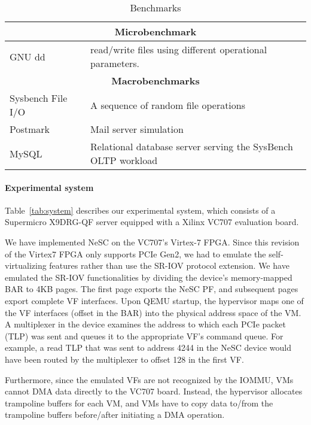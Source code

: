 \begin{table}[t]
  \small
  \begin{tabular}{|p{}|p{}|}
    \hline
    \multicolumn{2}{|c|}{\textbf{Microbenchmark}} \\
    \hline
    GNU dd~\cite{coreutils}	& read/write files using different operational parameters.\\
    \hline
    \hline
    \multicolumn{2}{|c|}{\textbf{Macrobenchmarks}} \\
    \hline
    Sysbench File I/O~\cite{kopytov2004sysbench}
    			& A sequence of random file operations \\
    \hline
    Postmark~\cite{katcher1997postmark}
    			& Mail server simulation \\
    \hline
    MySQL~\cite{mysql}	& Relational database server serving the SysBench OLTP workload  \\
    \hline
    \hline
  \end{tabular}

  \vspace*{-2ex}
  \caption{Benchmarks\label{tab:bench}}


\end{table}


\paragraph{Experimental system}
Table~\ref{tab:system} describes our experimental system, which consists of a Supermicro X9DRG-QF server equipped with a Xilinx VC707 evaluation board.

We have implemented NeSC on the VC707's Virtex-7 FPGA. Since this revision of the Virtex7 FPGA only supports PCIe Gen2, we had to emulate the self-virtualizing features rather than use the SR-IOV protocol extension. We have emulated the SR-IOV functionalities by dividing the device's memory-mapped BAR to 4KB pages. The first page exports the NeSC PF, and subsequent pages export complete VF interfaces. Upon QEMU startup, the hypervisor maps one of the VF interfaces (offset in the BAR) into the physical address space of the VM. A  multiplexer in the device examines the address to which each PCIe packet (TLP) was sent and queues it to the appropriate VF's command queue. For example, a read TLP that was sent to address 4244 in the NeSC device would have been routed by the multiplexer to offset 128 in the first VF.

Furthermore, since the emulated VFs are not recognized by the IOMMU, VMs cannot DMA data directly to the VC707 board. Instead, the hypervisor allocates trampoline buffers for each VM, and VMs have to copy data to/from the trampoline buffers before/after initiating a DMA operation.

